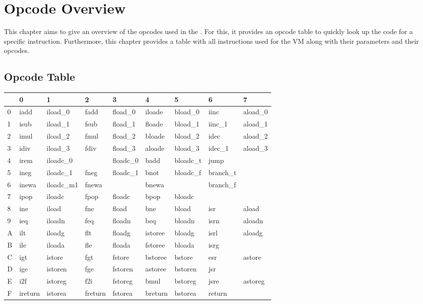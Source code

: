 \chapter{Opcode Overview}

This chapter aims to give an overview of the opcodes used in the \civicvm{}. For this, it provides an opcode table to quickly look up the code for a specific instruction. Furthermore, this chapter provides a table with all instructions used for the VM along with their parameters and their opcodes.

\section{Opcode Table}
\begin{center}
{\ttfamily
\begin{tabular}{|l|llllllll|}
\hline
  & 0       & 1          & 2       & 3         & 4       & 5         & 6         & 7 \\
\hline
0 & iadd    & iload\_0   & fadd    & fload\_0  & iloade  & bload\_0  & iinc      & aload\_0 \\
1 & isub    & iload\_1   & fsub    & fload\_1  & floade  & bload\_1  & iinc\_1   & aload\_1 \\
2 & imul    & iload\_2   & fmul    & fload\_2  & bloade  & bload\_2  & idec      & aload\_2 \\
3 & idiv    & iload\_3   & fdiv    & fload\_3  & aloade  & bload\_3  & idec\_1   & aload\_3 \\
4 & irem    & iloadc\_0  &         & floadc\_0 & badd    & bloadc\_t & jump      & \\
5 & ineg    & iloadc\_1  & fneg    & floadc\_1 & bnot    & bloadc\_f & branch\_t & \\
6 & inewa   & iloadc\_m1 & fnewa   &           & bnewa   &           & branch\_f & \\
7 & ipop    & iloadc     & fpop    & floadc    & bpop    & bloadc    &           & \\
8 & ine     & iload      & fne     & fload     & bne     & bload     & isr       & aload  \\
9 & ieq     & iloadn     & feq     & floadn    & beq     & bloadn    & isrn      & aloadn \\
A & ilt     & iloadg     & flt     & floadg    & istoree & bloadg    & isrl      & aloadg \\
B & ile     & iloada     & fle     & floada    & fstoree & bloada    & isrg      & \\
C & igt     & istore     & fgt     & fstore    & bstoree & bstore    & esr       & astore \\
D & ige     & istoren    & fge     & fstoren   & astoree & bstoren   & jsr       & \\
E & i2f     & istoreg    & f2i     & fstoreg   & bmul    & bstoreg   & jsre      & astoreg \\
F & ireturn & istorea    & freturn & fstorea   & breturn & bstorea   & return    & \\
\hline
\end{tabular}
}
\end{center}

